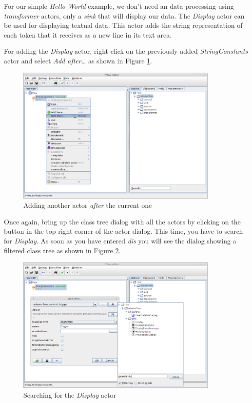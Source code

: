 For our simple \textit{Hello World} example, we don't need an data processing
using \textit{transformer} actors, only a \textit{sink} that will display our
data. The \textit{Display} actor can be used for displaying textual data. This
actor adds the string representation of each token that it receives as a new
line in its text area.

For adding the \textit{Display} actor, right-click on the previously added
\textit{StringConstants} actor and select \textit{Add after\ldots} as shown in
Figure \ref{floweditor-helloworld-addactor6}.

\begin{figure}[htb]
  \centering
  \includegraphics[width=10.0cm]{images/floweditor-helloworld-addactor6.png}
  \caption{Adding another actor \textit{after} the current one}
  \label{floweditor-helloworld-addactor6}
\end{figure}

Once again, bring up the class tree dialog with all the actors by clicking on
the button in the top-right corner of the actor dialog. This time, you have to
search for \textit{Display}. As soon as you have entered \textit{dis} you will
see the dialog showing a filtered class tree as shown in Figure
\ref{floweditor-helloworld-addactor7}.

\begin{figure}[htb]
  \centering
  \includegraphics[width=10.0cm]{images/floweditor-helloworld-addactor7.png}
  \caption{Searching for the \textit{Display} actor}
  \label{floweditor-helloworld-addactor7}
\end{figure}

